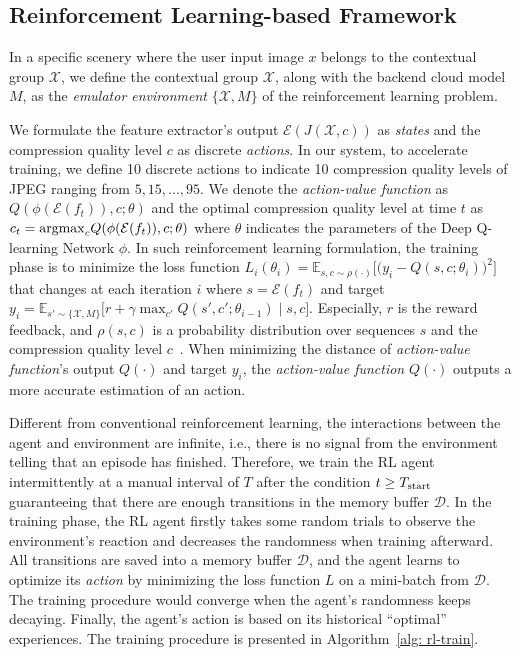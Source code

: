 \subsection{Reinforcement Learning-based Framework}

In a specific scenery where the user input image $ x $ belongs to the contextual group $ \mathcal{X} $, we define the contextual group $ \mathcal{X} $, along with the backend cloud model $ M $, as the \emph{emulator environment} $ \{\mathcal{X}, M\} $ of the reinforcement learning problem. 

We formulate the feature extractor's output $ \mathcal{E}(J(\mathcal{X}, c)) $ as \emph{states} and the compression quality level $ c $ as discrete \emph{actions}. In our system, to accelerate training, we define 10 discrete actions to indicate 10 compression quality levels of JPEG ranging from $ 5, 15, ...,95 $. We denote the \emph{action-value function} as $ Q(\phi(\mathcal{E}(f_t)), c; \theta) $ and the optimal compression quality level at time $ t $ as $ c_t = {\rm argmax}_cQ(\phi(\mathcal{E}(f_t)), c; \theta) $ where $ \theta $ indicates the parameters of the Deep Q-learning Network $ \phi $. In such reinforcement learning formulation, the training phase is to minimize the loss function $ L_i(\theta_i) = \mathbb{E}_{s, c \sim \rho (\cdot)}\Big[\big(y_i - Q(s, c; \theta_i)\big)^2 \Big] $ that changes at each iteration $ i $ where $ s = \mathcal{E}(f_t) $ and target $ y_i = \mathbb{E}_{s' \sim \{\mathcal{X}, M\}} \big[ r + \gamma \max_{c'} Q(s', c'; \theta_{i-1}) \mid s, c \big] $. Especially, $ r $ is the reward feedback, and $ \rho(s, c) $ is a probability distribution over sequences $ s $ and the compression quality level $ c $~\cite{DQN}. When minimizing the distance of \emph{action-value function}'s output $ Q(\cdot) $ and target $ y_i $, the \emph{action-value function} $ Q(\cdot) $ outputs a more accurate estimation of an action. 

Different from conventional reinforcement learning, the interactions between the agent and environment are infinite, i.e., there is no signal from the environment telling that an episode has finished. Therefore, we train the RL agent intermittently at a manual interval of $ T $ after the condition $ t \geq T_{\rm start} $ guaranteeing that there are enough transitions in the memory buffer $ \mathcal{D} $. In the training phase, the RL agent firstly takes some random trials to observe the environment's reaction and decreases the randomness when training afterward. All transitions are saved into a memory buffer $ \mathcal{D} $, and the agent learns to optimize its \emph{action} by minimizing the loss function $ L $ on a mini-batch from $ \mathcal{D} $. The training procedure would converge when the agent's randomness keeps decaying. Finally, the agent's action is based on its historical ``optimal'' experiences. The training procedure is presented in Algorithm~\ref{alg: rl-train}.


